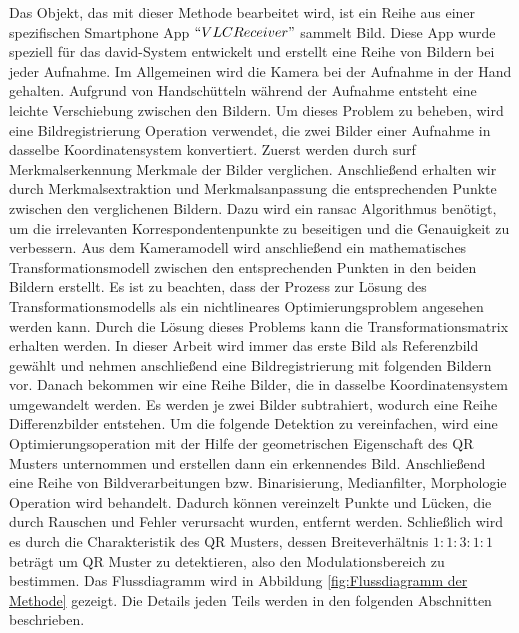 Das Objekt, das mit dieser Methode bearbeitet wird, ist ein Reihe aus einer spezifischen Smartphone App $ ``VLCReceiver" $ sammelt Bild. Diese App wurde speziell für das \gls{david}-System entwickelt und erstellt eine Reihe von Bildern bei jeder Aufnahme. Im Allgemeinen wird die Kamera bei der Aufnahme in der Hand gehalten. Aufgrund von Handschütteln während der Aufnahme entsteht eine leichte Verschiebung zwischen den Bildern. Um dieses Problem zu beheben, wird eine Bildregistrierung Operation verwendet, die zwei Bilder einer Aufnahme in dasselbe Koordinatensystem konvertiert. Zuerst werden durch \gls{surf} Merkmalserkennung Merkmale der Bilder verglichen. 
Anschließend erhalten wir durch Merkmalsextraktion und Merkmalsanpassung die entsprechenden Punkte zwischen den verglichenen Bildern. Dazu wird ein \gls{ransac} Algorithmus benötigt, um die irrelevanten Korrespondentenpunkte zu beseitigen und die Genauigkeit zu verbessern. Aus dem Kameramodell wird anschließend ein mathematisches Transformationsmodell zwischen den entsprechenden Punkten in den beiden Bildern erstellt. Es ist zu beachten, dass der Prozess zur Lösung des Transformationsmodells als ein nichtlineares Optimierungsproblem angesehen werden kann.
Durch die Lösung dieses Problems kann die Transformationsmatrix erhalten werden. In dieser Arbeit wird immer das erste Bild als Referenzbild gewählt und nehmen anschließend eine Bildregistrierung mit folgenden Bildern vor. Danach bekommen wir eine Reihe Bilder, die in dasselbe Koordinatensystem umgewandelt werden. Es werden je zwei Bilder subtrahiert, wodurch eine Reihe Differenzbilder entstehen. Um die folgende Detektion zu vereinfachen, wird eine Optimierungsoperation mit der Hilfe der geometrischen Eigenschaft des QR Musters unternommen und erstellen dann ein erkennendes Bild. Anschließend eine Reihe von Bildverarbeitungen bzw. Binarisierung, Medianfilter, Morphologie Operation wird behandelt. Dadurch können vereinzelt Punkte und Lücken, die durch Rauschen und Fehler verursacht wurden, entfernt werden. Schließlich wird es durch die Charakteristik des QR Musters, dessen Breiteverhältnis $1:1:3:1:1$ beträgt um QR Muster zu detektieren, also den Modulationsbereich zu bestimmen. Das Flussdiagramm wird in Abbildung \ref{fig:Flussdiagramm der Methode} gezeigt. Die Details jeden Teils werden in den folgenden Abschnitten beschrieben.

